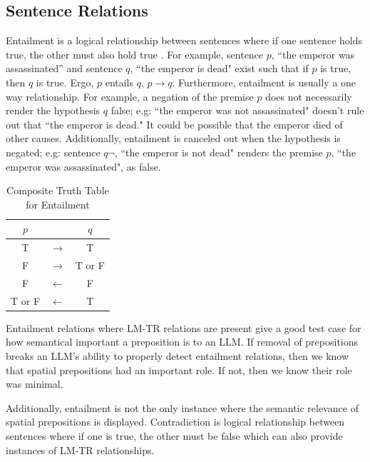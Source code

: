 \documentclass[12pt,letterpaper]{article}
\begin{document}
\subsection{Sentence Relations}
Entailment is a logical relationship between sentences where if one sentence holds true, the other must also hold true \citep[pp.~94--95]{saeed_semantics_2016}. For example, sentence $p$, ``the emperor was assassinated'' and sentence $q$, ``the emperor is dead" exist such that if $p$ is true, then $q$ is true. Ergo, $p$ entails $q$, $p \rightarrow q$. Furthermore, entailment is usually a one way relationship. For example, a negation of the premise $p$ does not necessarily render the hypothesis $q$ false; e.g: ``the emperor was not assassinated" doesn't rule out that ``the emperor is dead." It could be possible that the emperor died of other causes. Additionally, entailment is canceled out when the hypothesis is negated; e.g: sentence $q\neg$, ``the emperor is not dead" renders the premise $p$, ``the emperor was assassinated", as false. 

\begin{table}[h]
\centering
	\begin{tabular}{c c c}
	$p$ &   & $q$\\
	\hline
	T & $\rightarrow$ & T \\
	F & $\rightarrow$ & T or F\\
    F & $\leftarrow$ & F\\
    T or F & $\leftarrow$ & T\\
	\hline
	\end{tabular}
\caption{Composite Truth Table for Entailment \protect\citep[p.~95]{saeed_semantics_2016}} 
\label{t:entail_table}
\end{table}



Entailment relations where LM-TR relations are present give a good test case for how semantical important a preposition is to an LLM. If removal of prepositions breaks an LLM's ability to properly detect entailment relations, then we know that spatial prepositions had an important role. If not, then we know their role was minimal. 


Additionally, entailment is not the only instance where the semantic relevance of spatial prepositions is displayed. Contradiction is logical relationship between sentences where if one is true, the other must be false \citep[p.~97]{saeed_semantics_2016} which can also provide instances of LM-TR relationships. 
\end{document}
